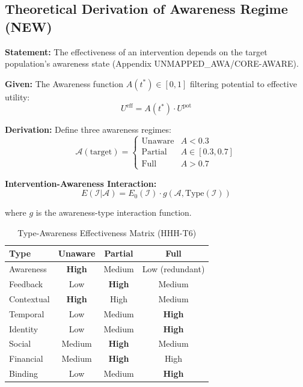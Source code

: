 \subsection{Theoretical Derivation of Awareness Regime (NEW)}
\label{sec:hhh-awareness}

\begin{tcolorbox}[colback=blue!5!white, colframe=blue!75!black,
    title=\textbf{Theorem HHH-T6: Awareness Regime Emergence from AWARE}]

\textbf{Statement:} The effectiveness of an intervention depends on the target population's awareness state (Appendix UNMAPPED_AWA/CORE-AWARE).

\textbf{Given:} The Awareness function $A(t^*) \in [0, 1]$ filtering potential to effective utility:
\begin{equation}
U^{\text{eff}} = A(t^*) \cdot U^{\text{pot}}
\end{equation}

\textbf{Derivation:} Define three awareness regimes:
\begin{equation}
\mathcal{A}(\text{target}) = \begin{cases}
\text{Unaware} & A < 0.3 \\
\text{Partial} & A \in [0.3, 0.7] \\
\text{Full} & A > 0.7
\end{cases}
\label{eq:hhh-awareness-regime}
\end{equation}

\textbf{Intervention-Awareness Interaction:}
\begin{equation}
E(\mathcal{I} | \mathcal{A}) = E_0(\mathcal{I}) \cdot g(\mathcal{A}, \text{Type}(\mathcal{I}))
\end{equation}

where $g$ is the awareness-type interaction function.

\end{tcolorbox}

\begin{table}[htbp]
\centering
\caption{Type-Awareness Effectiveness Matrix (HHH-T6)}
\label{tab:hhh-awareness-matrix}
\renewcommand{\arraystretch}{1.2}
\begin{tabular}{@{}l|ccc@{}}
\toprule
\textbf{Type} & \textbf{Unaware} & \textbf{Partial} & \textbf{Full} \\
\midrule
Awareness & \textbf{High} & Medium & Low (redundant) \\
Feedback & Low & \textbf{High} & Medium \\
Contextual & \textbf{High} & High & Medium \\
Temporal & Low & Medium & \textbf{High} \\
Identity & Low & Medium & \textbf{High} \\
Social & Medium & \textbf{High} & Medium \\
Financial & Medium & \textbf{High} & High \\
Binding & Low & Medium & \textbf{High} \\
\bottomrule
\end{tabular}
\end{table}


